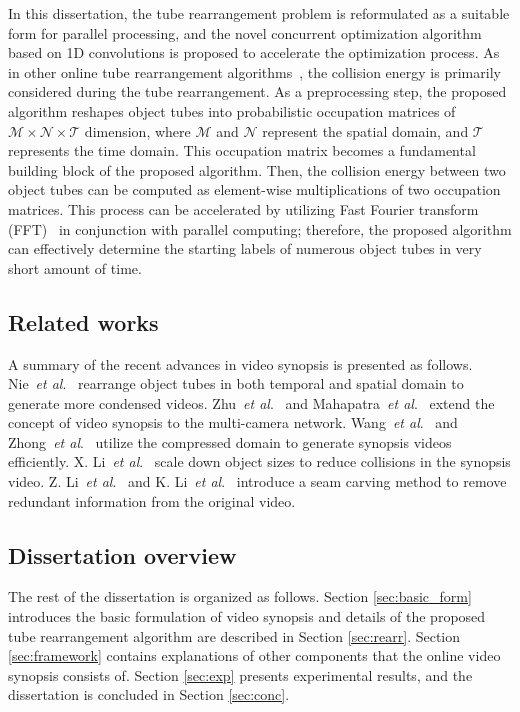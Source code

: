 \documentclass[11pt]{hyu_thesis}
\newcommand{\etal}{\textit{et al}.}
\begin{document}
In this dissertation, the tube rearrangement problem is reformulated as a suitable form for parallel processing, and the novel concurrent optimization algorithm based on 1D convolutions is proposed to accelerate the optimization process. As in other online tube rearrangement algorithms~\cite{Huang2014,ShikunFeng2012,JianqingZhu2015,He2017,Fu2014}, the collision energy is primarily considered during the tube rearrangement. As a preprocessing step, the proposed algorithm reshapes object tubes into probabilistic occupation matrices of $\mathcal{M} \times \mathcal{N} \times \mathcal{T}$ dimension, where $\mathcal{M}$ and $\mathcal{N}$ represent the spatial domain, and $\mathcal{T}$ represents the time domain. This occupation matrix becomes a fundamental building block of the proposed algorithm. Then, the collision energy between two object tubes can be computed as element-wise multiplications of two occupation matrices. This process can be accelerated by utilizing Fast Fourier transform (FFT)~\cite{Oppenheim2009} in conjunction with parallel computing; therefore, the proposed algorithm can effectively determine the starting labels of numerous object tubes in very short amount of time.

\subsection{Related works}
A summary of the recent advances in video synopsis is presented as follows. Nie~\etal~\cite{Nie2014} rearrange object tubes in both temporal and spatial domain to generate more condensed videos. Zhu~\etal~\cite{Zhu2014} and Mahapatra~\etal~\cite{Mahapatra2016} extend the concept of video synopsis to the multi-camera network. Wang~\etal~\cite{Wang2013} and Zhong~\etal~\cite{RuiZhong2014} utilize the compressed domain to generate synopsis videos efficiently. X. Li~\etal~\cite{Li2016a} scale down object sizes to reduce collisions in the synopsis video. Z. Li~\etal~\cite{ZhuangLi2009} and K. Li~\etal~\cite{Li2016} introduce a seam carving method to remove redundant information from the original video.

\subsection{Dissertation overview}
The rest of the dissertation is organized as follows. Section \ref{sec:basic_form} introduces the basic formulation of video synopsis and details of the proposed tube rearrangement algorithm are described in Section \ref{sec:rearr}. Section \ref{sec:framework} contains explanations of other components that the online video synopsis consists of. Section \ref{sec:exp} presents experimental results, and the dissertation is concluded in Section \ref{sec:conc}.
\end{document}
